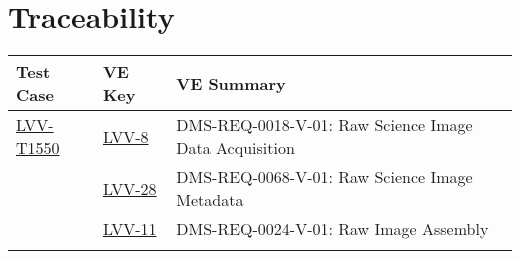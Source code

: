 \section{Traceability}

\begin{longtable}{p{3cm}p{3cm}L{9cm}}
\hline
\textbf{Test Case} & \textbf{VE Key} & \textbf{VE Summary} \\ \hline
\href{https://jira.lsstcorp.org/secure/Tests.jspa#/testCase/LVV-T1550}{LVV-T1550} &
  \href{https://jira.lsstcorp.org/browse/LVV-8}{LVV-8}
  & DMS-REQ-0018-V-01: Raw Science Image Data Acquisition
 \\ 
 &   \href{https://jira.lsstcorp.org/browse/LVV-28}{LVV-28}
  & DMS-REQ-0068-V-01: Raw Science Image Metadata
 \\ 
 &   \href{https://jira.lsstcorp.org/browse/LVV-11}{LVV-11}
  & DMS-REQ-0024-V-01: Raw Image Assembly
 \\ 
\hline
\end{longtable}
